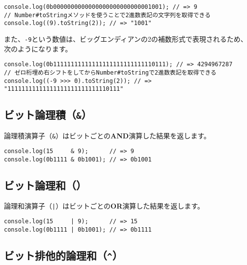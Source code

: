 \begin{lstlisting}
console.log(0b0000000000000000000000000001001); // => 9
// Number#toStringメソッドを使うことで2進数表記の文字列を取得できる
console.log((9).toString(2)); // => "1001"
\end{lstlisting}

また、\texttt{-9}という数値は、ビッグエンディアンの2の補数形式で表現されるため、次のようになります。

\begin{lstlisting}
console.log(0b11111111111111111111111111110111); // => 4294967287
// ゼロ桁埋め右シフトをしてからNumber#toStringで2進数表記を取得できる
console.log((-9 >>> 0).toString(2)); // => "11111111111111111111111111110111"
\end{lstlisting}

\hypertarget{bit-and}{%
\subsection{\texorpdfstring{ビット論理積（\texttt{\&}）}{ビット論理積（\&）}}\label{bit-and}}

論理積演算子（\texttt{\&}）はビットごとの\textbf{AND}演算した結果を返します。

\begin{lstlisting}
console.log(15     & 9);      // => 9
console.log(0b1111 & 0b1001); // => 0b1001
\end{lstlisting}

\hypertarget{bit-or}{%
\subsection{\texorpdfstring{ビット論理和（\texttt{\textbar{}}）}{ビット論理和（\textbar{}）}}\label{bit-or}}

論理和演算子（\texttt{|}）はビットごとの\textbf{OR}演算した結果を返します。

\begin{lstlisting}
console.log(15     | 9);      // => 15
console.log(0b1111 | 0b1001); // => 0b1111
\end{lstlisting}

\hypertarget{bit-xor}{%
\subsection{\texorpdfstring{ビット排他的論理和（\texttt{\^{}}）}{ビット排他的論理和（\^{}）}}\label{bit-xor}}

